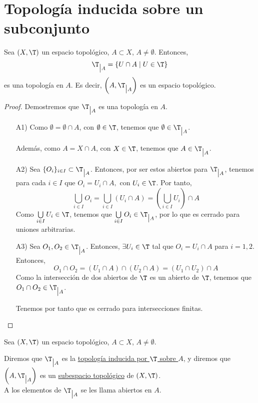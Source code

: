 \section{Topología inducida sobre un subconjunto}
\begin{prop}
    Sea $(X,\T)$ un espacio topológico, $A\subset X$, $A\neq \emptyset$. Entonces,
    \begin{equation*}
        \T_{\big| A} = \{U\cap A\mid U\in \T\}
    \end{equation*}
    es una topología en $A$. Es decir, $\left(A,\T_{\big| A}\right)$ es un espacio topológico.
\end{prop}
\begin{proof}
    Demostremos que $\T_{\big| A}$ es una topología en $A$.
    \begin{enumerate}
        \item[A1)] Como $\emptyset=\emptyset\cap A$, con $\emptyset\in \T$, tenemos que $\emptyset\in \T_{\big| A}$.

        Además, como $A=X\cap A$, con $X\in \T$, tenemos que $A\in  \T_{\big| A}$.

        \item[A2)] Sea $\{O_i\}_{i\in I}\subset \T_{\big| A}$. Entonces, por ser estos abiertos para $\T_{\big| A}$, tenemos para cada $i\in I$ que $O_i=U_i\cap A,$ con $U_i\in \T$. Por tanto,
        \begin{equation*}
            \bigcup_{i\in I}O_i = \bigcup_{i\in I}(U_i\cap A) = \left(\bigcup_{i\in I}U_i\right)\cap A
        \end{equation*}
        Como $\bigcup\limits_{i\in I}U_i\in \T$, tenemos que $\bigcup\limits_{i\in I}O_i\in \T_{\big| A}$, por lo que es cerrado para uniones arbitrarias.

        \item[A3)] Sea $O_1, O_2\in \T_{\big| A}$. Entonces, $\exists U_i\in \T$ tal que $O_i=U_i\cap A$ para $i=1,2$. Entonces,
        \begin{equation*}
            O_1\cap O_2 = (U_1\cap A) \cap (U_2\cap A) = (U_1\cap U_2)\cap A
        \end{equation*}
        Como la intersección de dos abiertos de $\T$ es un abierto de $\T$, tenemos que $O_1\cap O_2\in \T_{\big| A}$.

        Tenemos por tanto que es cerrado para intersecciones finitas.
    \end{enumerate}
\end{proof}


\begin{definicion}
    Sea $(X,\T)$ un espacio topológico, $A\subset X$, $A\neq \emptyset$.

    Diremos que $\T_{\big| A}$ es la \ul{topología inducida por $\T$ sobre $A$}, y diremos que $\left(A,\T_{\big| A}\right)$ es un \ul{subespacio topológico} de $(X,\T)$.\\

    A los elementos de $\T_{\big| A}$ se les llama abiertos en $A$.
\end{definicion}

